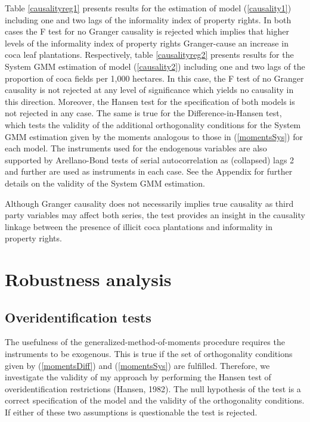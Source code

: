 \documentclass[12pt,a4paper,english]{article}%
\begin{document}
Table \ref{causalityreg1} presents results for the estimation of model (\ref{causality1}) including one and two lags of the informality index of property rights. In both cases the F test for no Granger causality is rejected which implies that higher levels of the informality index of property rights Granger-cause an increase in coca leaf plantations. Respectively, table \ref{causalityreg2} presents results for the System GMM estimation of model (\ref{causality2}) including one and two lags of the proportion of coca fields per 1,000 hectares. In this case, the F test of no Granger causality is not rejected at any level of significance which yields no causality in this direction. Moreover, the Hansen test for the specification of both models is not rejected in any case. The same is true for the Difference-in-Hansen test, which tests the validity of the additional orthogonality conditions for the System GMM estimation given by the moments analogous to those in (\ref{momentsSys}) for each model. The instruments used for the endogenous variables are also supported by Arellano-Bond tests of serial autocorrelation as (collapsed) lags 2 and further are used as instruments in each case. See the Appendix for further details on the validity of the System GMM estimation.

Although Granger causality does not necessarily implies true causality as third party variables may affect both series, the test provides an insight in the causality linkage between the presence of illicit coca plantations and informality in property rights.

\section{Robustness analysis}

\subsection{Overidentification tests}
\label{overid}

The usefulness of the generalized-method-of-moments procedure requires the instruments to be exogenous. This is true if the set of orthogonality conditions given by (\ref{momentsDiff}) and (\ref{momentsSys}) are fulfilled. Therefore, we investigate the validity of my approach by performing the Hansen test of overidentification restrictions (Hansen, 1982). The null hypothesis of the test is a correct specification of the model and the validity of the orthogonality conditions. If either of these two assumptions is questionable the test is rejected.
\end{document}
